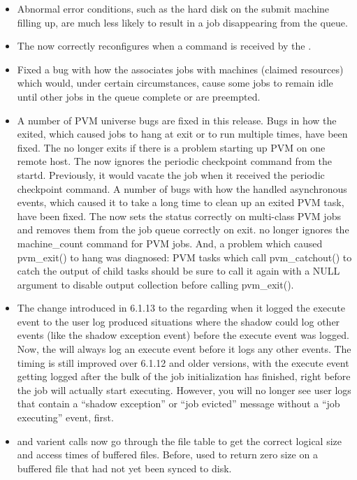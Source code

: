 \begin{itemize}
\item Abnormal error conditions, such as the hard disk on the submit
machine filling up, are much less likely to result in a job disappearing
from the queue.

\item The  now correctly reconfigures when
a  command is received by the .

\item Fixed a bug with how the  associates jobs with
machines (claimed resources) which would, under certain circumstances,
cause some jobs to remain idle until other jobs in the queue complete
or are preempted.

\item A number of PVM universe bugs are fixed in this release.
Bugs in how the  exited, which caused jobs to hang
at exit or to run multiple times, have been fixed.
The  no longer exits if there is a problem starting
up PVM on one remote host.
The  now ignores the periodic checkpoint command
from the startd.  Previously, it would vacate the job when it received
the periodic checkpoint command.
A number of bugs with how the  handled
asynchronous events, which caused it to take a long time to clean up
an exited PVM task, have been fixed.
The  now sets the status correctly on multi-class PVM
jobs and removes them from the job queue correctly on exit.
 no longer ignores the machine\_count command for PVM
jobs.
And, a problem which caused pvm\_exit() to hang was diagnosed:
PVM tasks which call pvm\_catchout() to catch the output of
child tasks should be sure to call it again with a NULL argument to
disable output collection before calling pvm\_exit().

\item The change introduced in 6.1.13 to the  regarding
when it logged the execute event to the user log produced situations
where the shadow could log other events (like the shadow exception
event) before the execute event was logged.
Now, the  will always log an execute event before it
logs any other events.
The timing is still improved over 6.1.12 and older versions, with the
execute event getting logged after the bulk of the job initialization
has finished, right before the job will actually start executing.
However, you will no longer see user logs that contain a ``shadow
exception'' or ``job evicted'' message without a ``job executing''
event, first.

\item {} and varient calls now go through the file table to
get the correct logical size and access times of buffered files.
Before,  used to return zero size on a buffered file that had
not yet been synced to disk.

\end{itemize}

